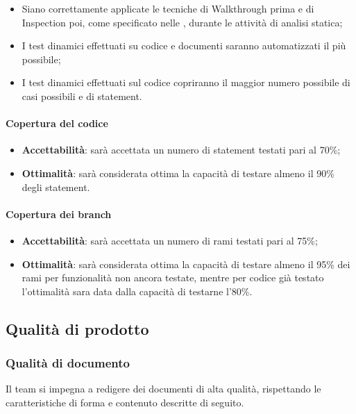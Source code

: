 \begin{itemize}
	\item Siano correttamente applicate le tecniche di Walkthrough prima e di Inspection poi, come specificato nelle \NdP, durante le attività di analisi statica;
	\item I test dinamici effettuati su codice e documenti saranno automatizzati il più possibile;
	\item I test dinamici effettuati sul codice copriranno il maggior numero possibile di casi possibili e di statement.
\end{itemize}

\paragraph{Copertura del codice}
\begin{itemize}
	\item \textbf{Accettabilità}: sarà accettata un numero di statement testati pari al 70\%;
	\item \textbf{Ottimalità}: sarà considerata ottima la capacità di testare almeno il 90\% degli statement.
\end{itemize}

\paragraph{Copertura dei branch}
\begin{itemize}
	\item \textbf{Accettabilità}: sarà accettata un numero di rami testati pari al 75\%;
	\item \textbf{Ottimalità}: sarà considerata ottima la capacità di testare almeno il 95\% dei rami per funzionalità non ancora testate, mentre per codice già testato l'ottimalità sara data dalla capacità di testarne l'80\%.
\end{itemize}


\subsection{Qualità di prodotto}
\subsubsection{Qualità di documento}
Il team si impegna a redigere dei documenti di alta qualità, rispettando le caratteristiche di forma e contenuto descritte di seguito.
